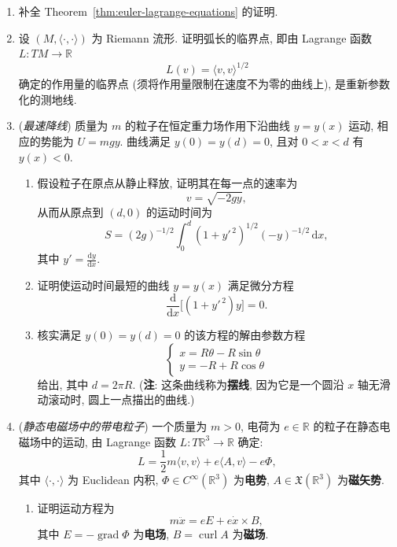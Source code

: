 \begin{RiemannExercise}\label{ex:lagrangian-mechanics}
\begin{enumerate}[label=(\arabic*),ref=\arabic*,leftmargin=*]
\item\label{ex:complete-proof-of-euler-lagrange-equations}
补全 Theorem~\ref{thm:euler-lagrange-equations} 的证明.
\item\label{ex:arclength-critical-curves}
设 $(M,\langle\cdot,\cdot\rangle)$ 为 Riemann 流形. 证明弧长的临界点, 即由 Lagrange 函数 $L:TM\to\mathbb{R}$
\[
  L(v)=\langle v,v\rangle^{1/2}
\]
确定的作用量的临界点 (须将作用量限制在速度不为零的曲线上), 是重新参数化的测地线.
\item\label{ex:brachistochrone-curve}
(\emph{最速降线}) 质量为 $m$ 的粒子在恒定重力场作用下沿曲线 $y=y(x)$ 运动, 相应的势能为 $U=mgy$. 曲线满足 $y(0)=y(d)=0$, 且对 $0<x<d$ 有 $y(x)<0$.
\begin{enumerate}[label=(\alph*),leftmargin=*]
\item 假设粒子在原点从静止释放, 证明其在每一点的速率为
\[
  v=\sqrt{-2gy},
\]
从而从原点到 $(d,0)$ 的运动时间为
\[
  S=(2g)^{-1/2}\int_0^d(1+y'^{\,2})^{1/2}(-y)^{-1/2}\,\mathrm{d}x,
\]
其中 $y'=\frac{\mathrm{d}y}{\mathrm{d}x}$.
\item 证明使运动时间最短的曲线 $y=y(x)$ 满足微分方程
\[
  \frac{\mathrm{d}}{\mathrm{d}x}\bigl[(1+y'^{\,2})y\bigr]=0.
\]
\item 核实满足 $y(0)=y(d)=0$ 的该方程的解由参数方程
\[
  \begin{cases}
    x=R\theta-R\sin\theta\\
    y=-R+R\cos\theta
  \end{cases}
\]
给出, 其中 $d=2\pi R$. (\textbf{注}: 这条曲线称为\textbf{摆线}, 因为它是一个圆沿 $x$ 轴无滑动滚动时, 圆上一点描出的曲线.)
\end{enumerate}
\item\label{ex:charged-particle-in-stationary-field}
(\emph{静态电磁场中的带电粒子}) 一个质量为 $m>0$, 电荷为 $e\in\mathbb{R}$ 的粒子在静态电磁场中的运动, 由 Lagrange 函数 $L:T\mathbb{R}^3\to\mathbb{R}$ 确定:
\[
  L=\frac{1}{2}m\langle v,v\rangle+e\langle A,v\rangle-e\Phi,
\]
其中 $\langle\cdot,\cdot\rangle$ 为 Euclidean 内积, $\Phi\in C^\infty(\mathbb{R}^3)$ 为\textbf{电势}, $A\in\mathfrak{X}(\mathbb{R}^3)$ 为\textbf{磁矢势}.
\begin{enumerate}[label=(\alph*),leftmargin=*]
\item 证明运动方程为
\[
  m\ddot x=eE+e\dot x\times B,
\]
其中 $E=-\operatorname{grad}\Phi$ 为\textbf{电场}, $B=\operatorname{curl}A$ 为\textbf{磁场}.

\end{enumerate}
\end{enumerate}
\end{RiemannExercise}
